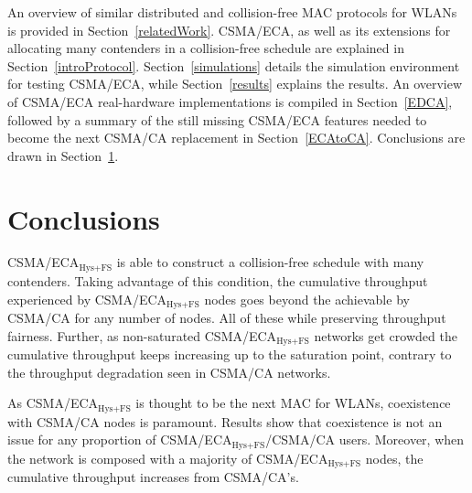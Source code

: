 \documentclass[a4paper,journal]{IEEEtran}
\begin{document}
An overview of similar distributed and collision-free MAC protocols for WLANs is provided in Section~\ref{relatedWork}. CSMA/ECA, as well as its extensions for allocating many contenders in a collision-free schedule are explained in Section~\ref{introProtocol}. Section~\ref{simulations} details the simulation environment for testing CSMA/ECA, while Section~\ref{results} explains the results. An overview of CSMA/ECA real-hardware implementations is compiled in Section~\ref{EDCA}, followed by a summary of the still missing CSMA/ECA features needed to become the next CSMA/CA replacement in Section~\ref{ECAtoCA}. Conclusions are drawn in Section~\ref{conclusions}.










\section{Conclusions}\label{conclusions}
CSMA/ECA$_{\text{Hys+FS}}$ is able to construct a collision-free schedule with many contenders. Taking advantage of this condition, the cumulative throughput experienced by CSMA/ECA$_{\text{Hys+FS}}$ nodes goes beyond the achievable by CSMA/CA for any number of nodes. All of these while preserving throughput fairness. Further, as non-saturated CSMA/ECA$_{\text{Hys+FS}}$ networks get crowded the cumulative throughput keeps increasing up to the saturation point, contrary to the throughput degradation seen in CSMA/CA networks.

As CSMA/ECA$_{\text{Hys+FS}}$ is thought to be the next MAC for WLANs, coexistence with CSMA/CA nodes is paramount. Results show that coexistence is not an issue for any proportion of CSMA/ECA$_{\text{Hys+FS}}$/CSMA/CA users. Moreover, when the network is composed with a majority of CSMA/ECA$_{\text{Hys+FS}}$ nodes, the cumulative throughput increases from CSMA/CA's.




\end{document}
